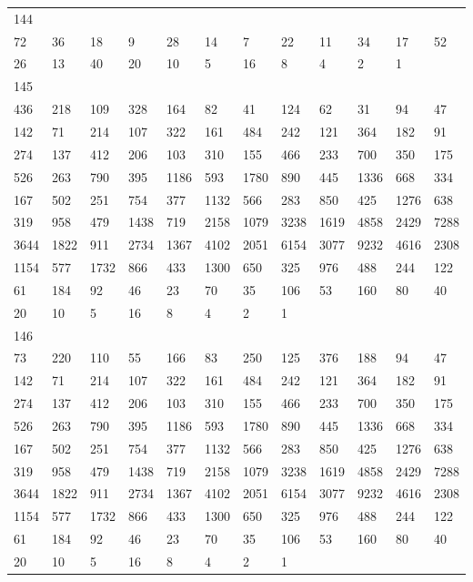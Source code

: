 \begin{longtable}{llllllllllll}
144&&&&&&&&&&&\\
72& 36& 18& 9& 28& 14& 7& 22& 11& 34& 17& 52\\
26& 13& 40& 20& 10& 5& 16& 8& 4& 2& 1& \\

145&&&&&&&&&&&\\
436& 218& 109& 328& 164& 82& 41& 124& 62& 31& 94& 47\\
142& 71& 214& 107& 322& 161& 484& 242& 121& 364& 182& 91\\
274& 137& 412& 206& 103& 310& 155& 466& 233& 700& 350& 175\\
526& 263& 790& 395& 1186& 593& 1780& 890& 445& 1336& 668& 334\\
167& 502& 251& 754& 377& 1132& 566& 283& 850& 425& 1276& 638\\
319& 958& 479& 1438& 719& 2158& 1079& 3238& 1619& 4858& 2429& 7288\\
3644& 1822& 911& 2734& 1367& 4102& 2051& 6154& 3077& 9232& 4616& 2308\\
1154& 577& 1732& 866& 433& 1300& 650& 325& 976& 488& 244& 122\\
61& 184& 92& 46& 23& 70& 35& 106& 53& 160& 80& 40\\
20& 10& 5& 16& 8& 4& 2& 1& \\

146&&&&&&&&&&&\\
73& 220& 110& 55& 166& 83& 250& 125& 376& 188& 94& 47\\
142& 71& 214& 107& 322& 161& 484& 242& 121& 364& 182& 91\\
274& 137& 412& 206& 103& 310& 155& 466& 233& 700& 350& 175\\
526& 263& 790& 395& 1186& 593& 1780& 890& 445& 1336& 668& 334\\
167& 502& 251& 754& 377& 1132& 566& 283& 850& 425& 1276& 638\\
319& 958& 479& 1438& 719& 2158& 1079& 3238& 1619& 4858& 2429& 7288\\
3644& 1822& 911& 2734& 1367& 4102& 2051& 6154& 3077& 9232& 4616& 2308\\
1154& 577& 1732& 866& 433& 1300& 650& 325& 976& 488& 244& 122\\
61& 184& 92& 46& 23& 70& 35& 106& 53& 160& 80& 40\\
20& 10& 5& 16& 8& 4& 2& 1& \\


\end{longtable}
